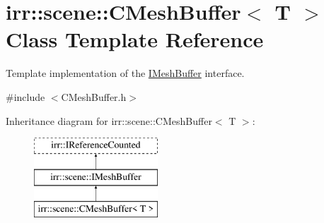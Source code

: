 \hypertarget{classirr_1_1scene_1_1CMeshBuffer}{}\section{irr\+:\+:scene\+:\+:C\+Mesh\+Buffer$<$ T $>$ Class Template Reference}
\label{classirr_1_1scene_1_1CMeshBuffer}


Template implementation of the \hyperlink{classirr_1_1scene_1_1IMeshBuffer}{I\+Mesh\+Buffer} interface.  




{\ttfamily \#include $<$C\+Mesh\+Buffer.\+h$>$}

Inheritance diagram for irr\+:\+:scene\+:\+:C\+Mesh\+Buffer$<$ T $>$\+:\begin{figure}[H]
\begin{center}
\leavevmode
\includegraphics[height=3.000000cm]{classirr_1_1scene_1_1CMeshBuffer}
\end{center}
\end{figure}
